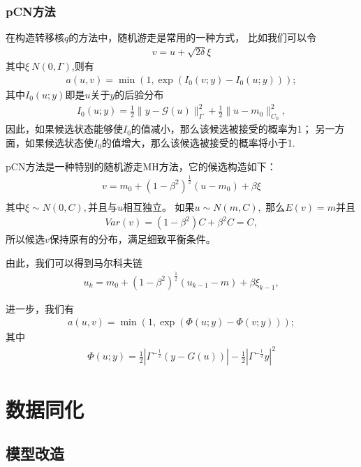 \documentclass[a4paper,12pt,oneside,CJK]{cctbook}
\theoremstyle{definition}
\numberwithin{equation}{section}
\begin{document}
\subsection{pCN方法}

在构造转移核$q$的方法中，随机游走是常用的一种方式，
比如我们可以令
\begin{eqnarray}
   v=u+\sqrt{2\delta}\xi
\end{eqnarray}
其中$\xi~N(0,\Gamma)$,则有
\begin{eqnarray}
   a(u,v)=\min(1,\exp(I_0(v;y)-I_0(u;y)));
\end{eqnarray}
其中$I_0(u;y)$即是$u$关于$y$的后验分布
\begin{eqnarray}
  I_0(u;y)=\frac{1}{2}\|y-\mathcal{G}(u)\|_{\Gamma}^2+\frac{1}{2}\|u-m_0\|_{C_0}^2,
\end{eqnarray}
因此，如果候选状态能够使$I_0$的值减小，那么该候选被接受的概率为1；
另一方面，如果候选状态使$I_0$的值增大，那么该候选被接受的概率将小于1.

pCN方法是一种特别的随机游走MH方法，它的候选构造如下：
\begin{eqnarray}
   v=m_0+(1-\beta^2)^{\frac{1}{2}}(u-m_0)+\beta \xi\\
\end{eqnarray}
其中$\xi\sim N(0,C),$并且与$u$相互独立。
如果$u\sim N(m,C),$ 那么$E(v)=m$并且
\begin{eqnarray}
   Var(v)=(1-\beta^2)C+\beta^2 C=C,
\end{eqnarray}
所以候选$v$保持原有的分布，满足细致平衡条件。

由此，我们可以得到马尔科夫链
\begin{eqnarray}
   u_k=m_0+(1-\beta^2)^\frac{1}{2}(u_{k-1}-m)+\beta \xi_{k-1},
\end{eqnarray}

进一步，我们有
\begin{eqnarray}
  a(u,v)=\min(1,\exp(\Phi(u;y)-\Phi(v;y)));  
\end{eqnarray}
其中
\begin{eqnarray*}
 \Phi(u;y)=\frac{1}{2}|\Gamma^{-\frac{1}{2}}(y-G(u))|-\frac{1}{2}|\Gamma^{-\frac{1}{2}}y|^2
\end{eqnarray*}

\chapter{数据同化}

\section{模型改造}
\end{document}
